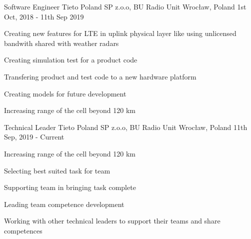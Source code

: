 \begin{cventries}
  \cventry
    {Software Engineer} %
    {Tieto Poland SP z.o.o, BU Radio Unit} %
    {Wrocław, Poland} %
    {1st Oct, 2018 - 11th Sep 2019} %
    {
      \begin{cvitems}
        \item {Creating new features for LTE in uplink physical layer like using unlicensed bandwith shared with weather radars}
        \item {Creating simulation test for a product code}
        \item {Transfering product and test code to a new hardware platform}
        \item {Creating models for future development}
        \item {Increasing range of the cell beyond 120 km}
      \end{cvitems}
    }

    \cventry
    {Technical Leader} %
    {Tieto Poland SP z.o.o, BU Radio Unit} %
    {Wrocław, Poland} %
    {11th Sep, 2019 - Current} %
    {
      \begin{cvitems}
        \item {Increasing range of the cell beyond 120 km}
        \item {Selecting best suited task for team}
        \item {Supporting team in bringing task complete}
        \item {Leading team competence development}
        \item {Working with other technical leaders to support their teams and share competences}
      \end{cvitems}
    }

\end{cventries}
